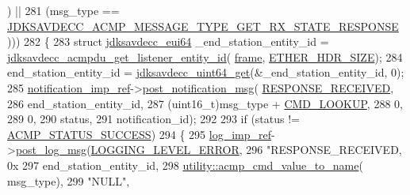 \begin{DoxyCode}
{      ) ||
281               (msg\_type == \hyperlink{group__acmp__message__type_ga30ae864d402e25fc3f458f742507ff26}{JDKSAVDECC\_ACMP\_MESSAGE\_TYPE\_GET\_RX\_STATE\_RESPONSE}
      )))
282     \{
283         \textcolor{keyword}{struct }\hyperlink{structjdksavdecc__eui64}{jdksavdecc\_eui64} \_end\_station\_entity\_id = 
      \hyperlink{group__acmpdu_ga138eb586d71333fa5c27c226373c771f}{jdksavdecc\_acmpdu\_get\_listener\_entity\_id}(
      \hyperlink{gst__avb__playbin_8c_ac8e710e0b5e994c0545d75d69868c6f0}{frame}, \hyperlink{namespaceavdecc__lib_a6c827b1a0d973e18119c5e3da518e65ca9512ad9b34302ba7048d88197e0a2dc0}{ETHER\_HDR\_SIZE});
284         end\_station\_entity\_id = \hyperlink{group__endian_gac8c2b48b7d7db101708e0197e366ac42}{jdksavdecc\_uint64\_get}(&\_end\_station\_entity\_id, 0);
285         \hyperlink{namespaceavdecc__lib_aca078f7550e970a17b3f732c26bc3d83}{notification\_imp\_ref}->\hyperlink{classavdecc__lib_1_1notification_a2775ca78354ea78d68bf107c084b3822}{post\_notification\_msg}(
      \hyperlink{namespaceavdecc__lib_ad2a3e740ca3019cf9fd0f9514afb6419a76526acf7fff481667c4ec404347c3ce}{RESPONSE\_RECEIVED},
286                                                     end\_station\_entity\_id,
287                                                     (uint16\_t)msg\_type + 
      \hyperlink{namespaceavdecc__lib_ab6b306ef981f5e21bb41ea2c2dbe8cd9a3d122abbe03d5d839b4708ad02b7586d}{CMD\_LOOKUP},
288                                                     0,
289                                                     0,
290                                                     status,
291                                                     notification\_id);
292 
293         \textcolor{keywordflow}{if} (status != \hyperlink{namespaceavdecc__lib_ae0a51eed2d4dfed01460049a240d6f34a6e7347496acf3a05a9b3dab05deb8765}{ACMP\_STATUS\_SUCCESS})
294         \{
295             \hyperlink{namespaceavdecc__lib_acbe3e2a96ae6524943ca532c87a28529}{log\_imp\_ref}->\hyperlink{classavdecc__lib_1_1log_a68139a6297697e4ccebf36ccfd02e44a}{post\_log\_msg}(\hyperlink{namespaceavdecc__lib_a501055c431e6872ef46f252ad13f85cdaf2c4481208273451a6f5c7bb9770ec8a}{LOGGING\_LEVEL\_ERROR},
296                                       \textcolor{stringliteral}{"RESPONSE\_RECEIVED, 0x%
297                                       end\_station\_entity\_id,
298                                       \hyperlink{namespaceavdecc__lib_1_1utility_a89e861257b12dded819c0e1966cbb798}{utility::acmp\_cmd\_value\_to\_name}(
      msg\_type),
299                                       \textcolor{stringliteral}{"NULL"},
}}
\end{DoxyCode}
